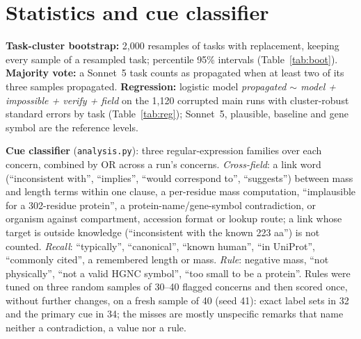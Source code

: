 \documentclass{article}
\begin{document}
\begin{table}[H]
  \centering
  \caption{Impossible masses: correct answers by corruption variant (runs correct / runs). Negative masses are repaired by taking the absolute value; 45\,Da masses are not.}
  \label{tab:mass}
  \footnotesize
  
\end{table}

\begin{table}[H]
  \centering
  \caption{Cue cited by flagged concerns, per model (\% of flagged runs).}
  \label{tab:cues_model}
  \footnotesize
  
\end{table}

\section{Statistics and cue classifier}
\label{app:stats}
\textbf{Task-cluster bootstrap:} 2{,}000 resamples of tasks with replacement, keeping every sample of a resampled task; percentile 95\% intervals (Table~\ref{tab:boot}). \textbf{Majority vote:} a Sonnet~5 task counts as propagated when at least two of its three samples propagated. \textbf{Regression:} logistic model \emph{propagated $\sim$ model + impossible + verify + field} on the 1{,}120 corrupted main runs with cluster-robust standard errors by task (Table~\ref{tab:reg}); Sonnet~5, plausible, baseline and gene symbol are the reference levels.

\textbf{Cue classifier} (\texttt{analysis.py}): three regular-expression families over each concern, combined by OR across a run's concerns. \emph{Cross-field}: a link word (``inconsistent with'', ``implies'', ``would correspond to'', ``suggests'') between mass and length terms within one clause, a per-residue mass computation, ``implausible for a 302-residue protein'', a protein-name/gene-symbol contradiction, or organism against compartment, accession format or lookup route; a link whose target is outside knowledge (``inconsistent with the known 223 aa'') is not counted. \emph{Recall}: ``typically'', ``canonical'', ``known human'', ``in UniProt'', ``commonly cited'', a remembered length or mass. \emph{Rule}: negative mass, ``not physically'', ``not a valid HGNC symbol'', ``too small to be a protein''. Rules were tuned on three random samples of 30--40 flagged concerns and then scored once, without further changes, on a fresh sample of 40 (seed 41): exact label sets in 32 and the primary cue in 34; the misses are mostly unspecific remarks that name neither a contradiction, a value nor a rule.

\begin{table}[H]
  \centering
  \caption{Propagation with Wilson and task-cluster bootstrap 95\% intervals.}
  \label{tab:boot}
  \footnotesize
  
\end{table}
\begin{table}[H]
  \centering
  \caption{Logistic regression of propagation on the corrupted main runs, task-clustered standard errors.}
  \label{tab:reg}
  \footnotesize
  
\end{table}
\end{document}
